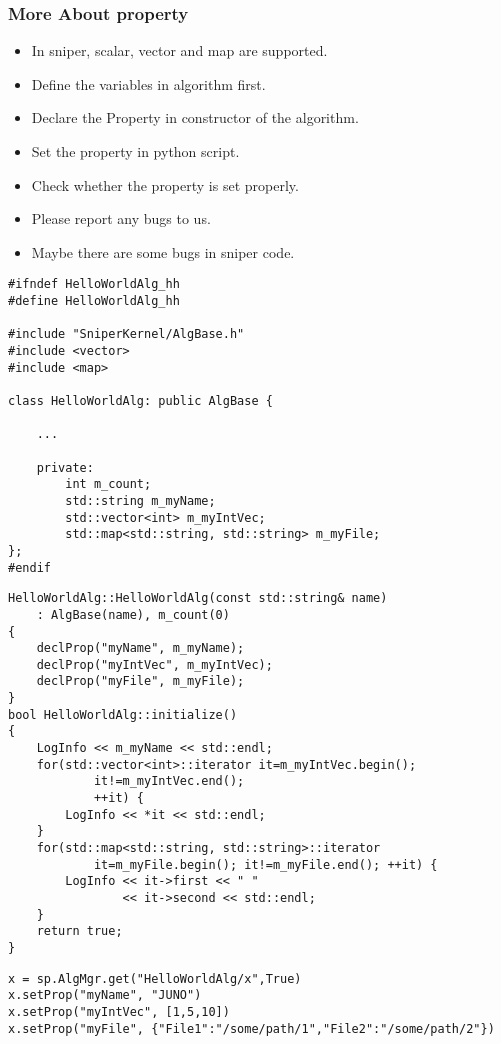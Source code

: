 \begin{frame}
    \frametitle{More About property}
    \begin{itemize}
        \item In sniper, scalar, vector and map are supported.
        \item Define the variables in algorithm first.
        \item Declare the Property in constructor of the algorithm.
        \item Set the property in python script.
        \item Check whether the property is set properly.
        \item Please report any bugs to us.
        \item Maybe there are some bugs in sniper code.
    \end{itemize}
\end{frame}

\newsavebox{\createalgmorepropheader}
\begin{lrbox}{\createalgmorepropheader}
\begin{lstlisting}
#ifndef HelloWorldAlg_hh
#define HelloWorldAlg_hh

#include "SniperKernel/AlgBase.h"
#include <vector>
#include <map>

class HelloWorldAlg: public AlgBase {

    ...

    private:
        int m_count;
        std::string m_myName;
        std::vector<int> m_myIntVec;
        std::map<std::string, std::string> m_myFile;
};
#endif
\end{lstlisting}
\end{lrbox}
\newsavebox{\createalgmorepropimpl}
\begin{lrbox}{\createalgmorepropimpl}
\begin{lstlisting}
HelloWorldAlg::HelloWorldAlg(const std::string& name)
    : AlgBase(name), m_count(0)
{
    declProp("myName", m_myName);
    declProp("myIntVec", m_myIntVec);
    declProp("myFile", m_myFile);
}
bool HelloWorldAlg::initialize()
{
    LogInfo << m_myName << std::endl;
    for(std::vector<int>::iterator it=m_myIntVec.begin();
            it!=m_myIntVec.end();
            ++it) {
        LogInfo << *it << std::endl;
    }
    for(std::map<std::string, std::string>::iterator 
            it=m_myFile.begin(); it!=m_myFile.end(); ++it) {
        LogInfo << it->first << " "
                << it->second << std::endl;
    }
    return true;
}
\end{lstlisting}
\end{lrbox}
\newsavebox{\createalgmoreproppython}
\begin{lrbox}{\createalgmoreproppython}
\begin{lstlisting}
x = sp.AlgMgr.get("HelloWorldAlg/x",True)
x.setProp("myName", "JUNO")
x.setProp("myIntVec", [1,5,10])
x.setProp("myFile", {"File1":"/some/path/1","File2":"/some/path/2"})
\end{lstlisting}
\end{lrbox}

